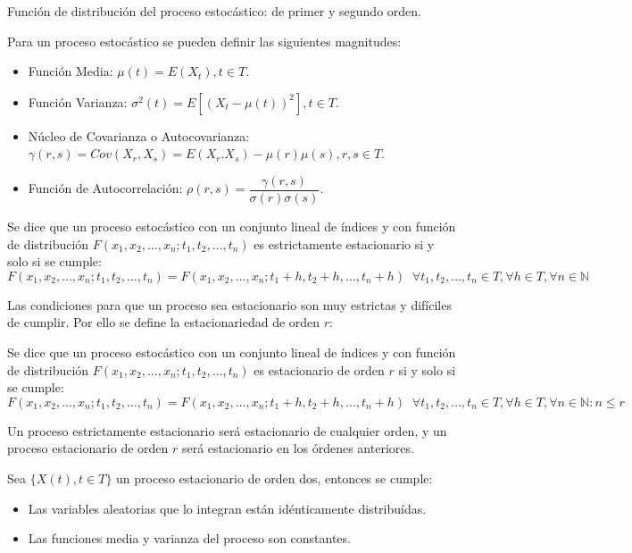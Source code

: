 Funci\'on de distribuci\'on del proceso estoc\'astico: de primer y segundo orden.


Para un proceso estoc\'astico se pueden definir las siguientes magnitudes:
\begin{itemize}
\item Funci\'on Media: $\mu(t) = E(X_t) , t\in T$.
\item Funci\'on Varianza: $\sigma^2(t)=E[(X_t-\mu(t))^2], t\in T$.
\item N\'ucleo de Covarianza o Autocovarianza: $\gamma(r,s)=Cov(X_r,X_s)=E(X_r.X_s)- \mu(r)\mu(s), r,s\in T$.
\item Funci\'on de Autocorrelaci\'on: $\rho(r,s)=\dfrac{\gamma(r,s)}{\sigma(r)\sigma(s)}$.
\end{itemize}

\begin{definicion}
Se dice que un proceso estoc\'astico con un conjunto lineal de \'indices y con funci\'on de distribuci\'on $F(x_1,x_2,\ldots,x_n;t_1,t_2,\ldots,t_n)$ es estrictamente estacionario si y solo si se cumple:
\begin{equation*}
F(x_1,x_2,\ldots,x_n;t_1,t_2,\ldots,t_n)=F(x_1,x_2,\ldots,x_n;t_1+h,t_2+h,\ldots,t_n+h)\;\;\forall t_1,t_2,\ldots,t_n\in T, \forall h\in T, \forall n\in\mathbb{N}
\end{equation*}

\end{definicion}

Las condiciones para que un proceso sea estacionario son muy estrictas y dif\'iciles de cumplir. Por ello se define la estacionariedad de orden $r$:
\begin{definicion}
Se dice que un proceso estoc\'astico con un conjunto lineal de \'indices y con funci\'on de distribuci\'on $F(x_1,x_2,\ldots,x_n;t_1,t_2,\ldots,t_n)$ es estacionario de orden $r$ si y solo si se cumple:
\begin{equation*}
F(x_1,x_2,\ldots,x_n;t_1,t_2,\ldots,t_n)=F(x_1,x_2,\ldots,x_n;t_1+h,t_2+h,\ldots,t_n+h)\;\;\forall t_1,t_2,\ldots,t_n\in T, \forall h\in T, \forall n\in\mathbb{N}:n\leq r
\end{equation*}

\end{definicion}

Un proceso estrictamente estacionario ser\'a estacionario de cualquier orden, y un proceso estacionario de orden $r$ ser\'a estacionario en los \'ordenes anteriores.

\begin{teorema}
Sea $\{X(t), t\in T\}$ un proceso estacionario de orden dos, entonces se cumple:
\begin{itemize}
\item Las variables aleatorias que lo integran est\'an id\'enticamente distribu\'idas.
\item Las funciones media y varianza del proceso son constantes.
\end{itemize}
\end{teorema}

